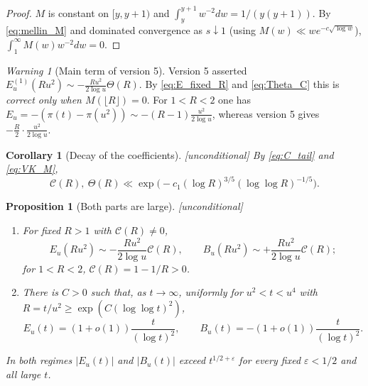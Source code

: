 \documentclass[11pt]{amsart}
\numberwithin{equation}{section}
\theoremstyle{plain}
\newtheorem{proposition}[theorem]{Proposition}
\newtheorem{corollary}[theorem]{Corollary}
\theoremstyle{definition}
\theoremstyle{remark}
\newtheorem{warning}[theorem]{Warning}
\newcommand{\eps}{\varepsilon}
\newcommand{\Cc}{\mathcal{C}}
\begin{document}
\begin{proof}
$M$ is constant on $[y,y+1)$ and $\int_y^{y+1}w^{-2}dw=1/(y(y+1))$. By
\eqref{eq:mellin_M} and dominated convergence as $s\downarrow1$ (using
$M(w)\ll we^{-c\sqrt{\log w}}$), $\int_1^\infty M(w)w^{-2}dw=0$.
\end{proof}

\begin{warning}[Main term of version 5]
\label{warn:v5_main_term}
Version 5 asserted $E_u^{(1)}(Ru^2)\sim-\frac{Ru^2}{2\log u}\Theta(R)$. By
\eqref{eq:E_fixed_R} and \eqref{eq:Theta_C} this is \emph{correct only when
$M(\lfloor R\rfloor)=0$}. For $1<R<2$ one has
$E_u=-(\pi(t)-\pi(u^2))\sim-(R-1)\frac{u^2}{2\log u}$, whereas version 5
gives $-\frac R2\cdot\frac{u^2}{2\log u}$.
\end{warning}

\begin{corollary}[Decay of the coefficients]
\label{cor:AR-VK}
\emph{[unconditional]} By \eqref{eq:C_tail} and \eqref{eq:VK_M},
\begin{equation}
\label{eq:AR-VK}
  \Cc(R),\ \Theta(R)\ll\exp\bigl(-c_1(\log R)^{3/5}(\log\log R)^{-1/5}\bigr).
\end{equation}
\end{corollary}

\begin{proposition}[Both parts are large]
\label{prop:both_parts_large}
\emph{[unconditional]}
\begin{enumerate}[label=\textup{(\roman*)}]
\item For fixed $R>1$ with $\Cc(R)\ne0$,
\begin{equation}
\label{eq:E_fixed_R_size}
  E_u(Ru^2)\sim-\frac{Ru^2}{2\log u}\Cc(R),\qquad
  B_u(Ru^2)\sim+\frac{Ru^2}{2\log u}\Cc(R);
\end{equation}
for $1<R<2$, $\Cc(R)=1-1/R>0$.
\item There is $C>0$ such that, as $t\to\infty$, uniformly for $u^2<t<u^4$
with $R=t/u^2\ge\exp(C(\log\log t)^2)$,
\begin{equation}
\label{eq:E_log2}
  E_u(t)=(1+o(1))\frac{t}{(\log t)^2},\qquad
  B_u(t)=-(1+o(1))\frac{t}{(\log t)^2}.
\end{equation}
\end{enumerate}
In both regimes $|E_u(t)|$ and $|B_u(t)|$ exceed $t^{1/2+\eps}$ for every
fixed $\eps<1/2$ and all large $t$.
\end{proposition}
\end{document}
